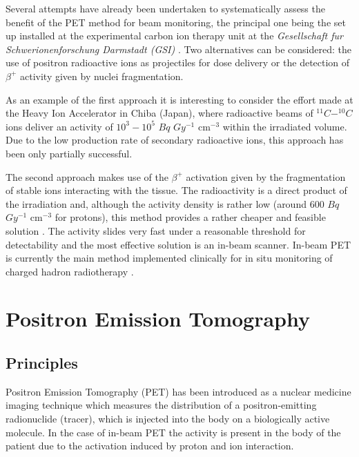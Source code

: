 Several attempts have already been undertaken to systematically assess the benefit of the PET method for beam monitoring, the principal one being the set up installed at the experimental carbon ion therapy unit at the \textit{Gesellschaft fur Schwerionenforschung Darmstadt (GSI)} \cite{Parodi2004}.
Two alternatives can be considered: the use of positron radioactive ions as projectiles for dose delivery or the detection of $\beta ^{+}$ activity given by nuclei fragmentation.

As an example of the first approach it is interesting to consider the effort made at the Heavy Ion Accelerator in Chiba (Japan), where radioactive beams of $^{11}C - ^{10}C$ ions deliver an activity of $10^{3} - 10^{5}$ $Bq$ $Gy^{-1}$ cm$^{-3}$ within the irradiated volume.
Due to the low production rate of secondary radioactive ions, this approach has been only partially successful.

The second approach makes use of the $\beta ^{+}$ activation given by the fragmentation of stable ions interacting with the tissue.
The radioactivity is a direct product of the irradiation and, although the activity density is rather low (around 600 $Bq$ $Gy^{-1}$ cm$^{-3}$ for protons), this method provides a rather cheaper and feasible solution \cite{Enghardt2004}.
The activity slides very fast under a reasonable threshold for detectability and the most effective solution is an in-beam scanner.
In-beam PET is currently the main method implemented clinically for in situ monitoring of charged hadron radiotherapy \cite{Crespo2007}.



\section{Positron Emission Tomography}
\subsection{Principles}
Positron Emission Tomography (PET) has been introduced as a nuclear medicine imaging technique which measures the distribution of a positron-emitting radionuclide (tracer), which is injected into the body on a biologically active molecule. In the case of in-beam PET the activity is present in the body of the patient due to the activation induced by proton and ion interaction.

